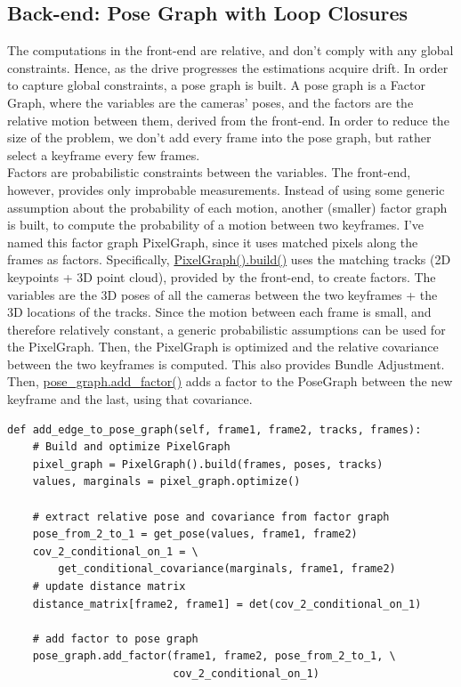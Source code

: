 \documentclass[12pt]{article}
\begin{document}
\subsection{Back-end: Pose Graph with Loop Closures}
The computations in the front-end are relative, and don't comply with any global constraints.
Hence, as the drive progresses the estimations acquire drift. In order to capture global constraints, a pose graph is built. A pose graph is a Factor Graph, where the variables are the cameras' poses, and the factors are the relative motion between them, derived from the front-end. In order to reduce the size of the problem, we don't add every frame into the pose graph, but rather select a keyframe every few frames. \\
Factors are probabilistic constraints between the variables. The front-end, however, provides only
improbable measurements. Instead of using some generic assumption about the probability of each motion, another (smaller) factor graph is built, to compute the probability of a motion between two keyframes. I've named this factor graph PixelGraph, since it uses matched pixels along the frames as factors. Specifically, \href{TODO}{PixelGraph().build()} uses the matching tracks (2D keypoints + 3D point cloud), provided by the front-end, to create factors. The variables are the 3D poses of all the cameras between the two keyframes + the 3D locations of the tracks. Since the motion between each frame is small, and therefore relatively constant, a generic probabilistic assumptions can be used for the PixelGraph. Then, the PixelGraph is optimized and the relative covariance between the two keyframes is computed. This also provides Bundle Adjustment. Then, \href{TODO}{pose_graph.add_factor()} adds a factor to the PoseGraph between the new keyframe and the last, using that covariance. 
\begin{tcolorbox}
\begin{verbatim}  
def add_edge_to_pose_graph(self, frame1, frame2, tracks, frames):
    # Build and optimize PixelGraph
    pixel_graph = PixelGraph().build(frames, poses, tracks)
    values, marginals = pixel_graph.optimize()
    
    # extract relative pose and covariance from factor graph
    pose_from_2_to_1 = get_pose(values, frame1, frame2)
    cov_2_conditional_on_1 = \
        get_conditional_covariance(marginals, frame1, frame2)
    # update distance matrix
    distance_matrix[frame2, frame1] = det(cov_2_conditional_on_1)
    
    # add factor to pose graph
    pose_graph.add_factor(frame1, frame2, pose_from_2_to_1, \
                          cov_2_conditional_on_1)

\end{verbatim}
\end{tcolorbox}
\end{document}
